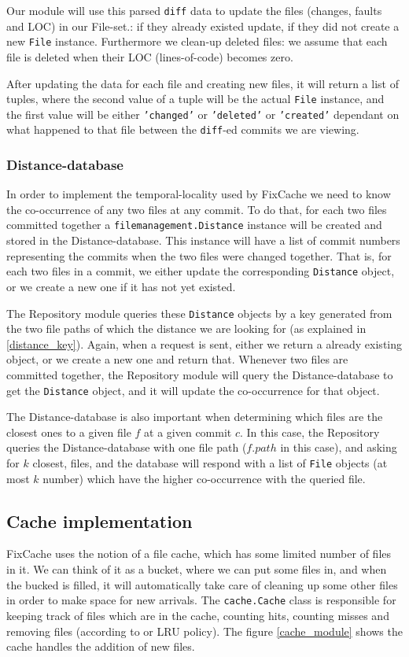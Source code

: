 \documentclass[12pt,twoside,notitlepage]{report}
\newcommand{\fxch}{FixCache}
\begin{document}
Our module will use this parsed \texttt{diff} data to update the files (changes, faults and LOC) in our File-set.: if they already existed update, if they did not create a new \texttt{File} instance. Furthermore we clean-up deleted files: we assume that each file is deleted when their LOC (lines-of-code) becomes zero.

After updating the data for each file and creating new files, it will return a list of tuples, where the second value of a tuple will be the actual \texttt{File} instance, and the first value will be either \texttt{'changed'} or \texttt{'deleted'} or \texttt{'created'} dependant on what happened to that file between the \texttt{diff}-ed commits we are viewing.
\subsubsection*{Distance-database}
In order to implement the temporal-locality used by \fxch{} we need to know the co-occurrence of any two files at any commit. To do that, for each two files committed together a \texttt{filemanagement.Distance} instance will be created and stored in the Distance-database. This instance will have a list of commit numbers representing the commits when the two files were changed together. That is, for each two files in a commit, we either update the corresponding \texttt{Distance} object, or we create a new one if it has not yet existed.

The Repository module queries these \texttt{Distance} objects by a key generated from the two file paths of which the distance we are looking for (as explained in \ref{distance_key}). Again, when a request is sent, either we return a already existing object, or we create a new one and return that. Whenever two files are committed together, the Repository module will query the Distance-database to get the \texttt{Distance} object, and it will update the co-occurrence for that object.

The Distance-database is also important when determining which files are the closest ones to a given file $f$ at a given commit $c$. In this case, the Repository queries the Distance-database with one file path ($f.path$ in this case), and asking for $k$ closest, files, and the database will respond with a list of \texttt{File} objects (at most $k$ number) which have the higher co-occurrence with the queried file.
\subsection{Cache implementation}
\fxch{} uses the notion of a file cache, which has some limited number of files in it. We can think of it as a bucket, where we can put some files in, and when the bucked is filled, it will automatically take care of cleaning up some other files in order to make space for new arrivals. The \texttt{cache.Cache} class is responsible for keeping track of files which are in the cache, counting hits, counting misses and removing files (according to or LRU policy). The figure \ref{cache_module} shows the cache handles the addition of new files.
\end{document}
